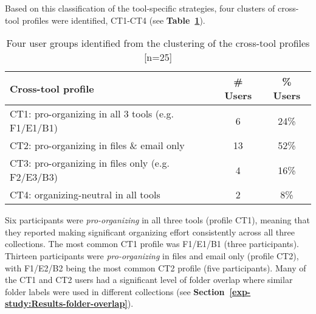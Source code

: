Based on this classification of the tool-specific strategies, four clusters of cross-tool profiles were identified, CT1-CT4 (see \textbf{Table~\ref{table:exp-study:file-cross-tool-profiles}}).

\begin{table}[btp]
\begin{center}
\begin{footnotesize}
\setlength{\extrarowheight}{8pt}
\begin{tabular}{|l|c|c|}
\hline
{\bf Cross-tool profile} & {\bf \# Users} & {\bf \% Users} \\
\hline
  CT1: pro-organizing in all 3 tools (e.g. F1/E1/B1) &          6 &       24\% \\
\hline
  CT2: pro-organizing in files \& email only &         13 &       52\% \\
\hline
  CT3: pro-organizing in files only (e.g. F2/E3/B3) &          4 &       16\% \\
\hline
  CT4: organizing-neutral in all tools &          2 &        8\% \\
\hline
\end{tabular}  
\end{footnotesize}
\caption{Four user groups identified from the clustering of the cross-tool profiles [n=25]}
\label{table:exp-study:file-cross-tool-profiles}
\end{center}
\end{table}

Six participants were \textit{pro-organizing} in all three tools (profile CT1), meaning that they reported making significant organizing effort consistently across all three collections. The most common CT1 profile was F1/E1/B1 (three participants).  Thirteen participants were \textit{pro-organizing} in files and email only (profile CT2), with F1/E2/B2 being the most common CT2 profile (five participants).  Many of the CT1 and CT2 users had a significant level of folder overlap where similar folder labels were used in different collections (see \textbf{Section~\ref{exp-study:Results-folder-overlap}}).

